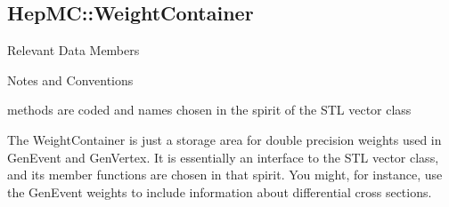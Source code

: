 \documentclass[11pt,letterpaper]{article}
\begin{document}
%
%

\subsection{HepMC::WeightContainer}
\begin{myitemize}{Relevant Data Members}
\end{myitemize}
\begin{myitemize}{Notes and Conventions}
\item methods are coded and names chosen in the spirit of the
  STL vector class
\end{myitemize}

The WeightContainer is just a storage area for double precision
weights used in GenEvent and GenVertex. It is essentially an interface
to the STL vector class, and its member functions are chosen in that
spirit.  
You might, for instance, use the GenEvent weights to include
information about differential cross sections.

%
%
\end{document}
